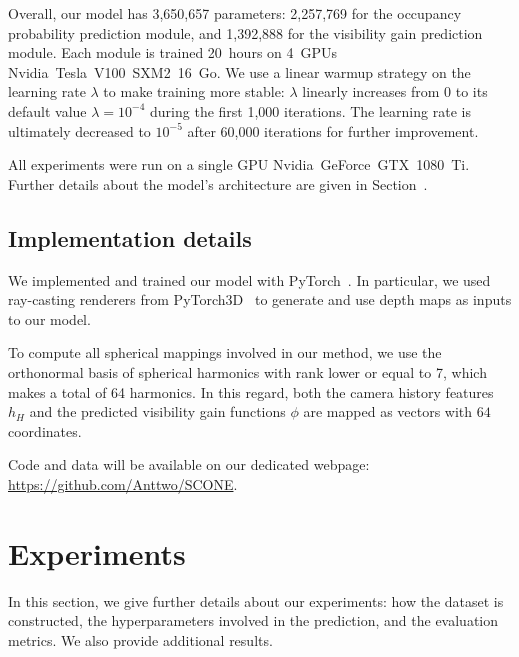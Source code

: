 {Overall, our model has 3,650,657 parameters: 2,257,769 for the occupancy probability prediction module, and 1,392,888 for the visibility gain prediction module. Each module is trained 20~hours on 4~GPUs Nvidia~Tesla~V100~SXM2~16~Go. %
%
We use a linear warmup strategy on the learning rate $\lambda$ to make training more stable: $\lambda$ linearly increases from 0 to its default value $\lambda=10^{-4}$ during the first 1,000 iterations. The learning rate is ultimately decreased to $10^{-5}$ after 60,000 iterations for further improvement.

All experiments were run on a single GPU Nvidia~GeForce~GTX~1080~Ti. Further details about the model's architecture are given in Section~.}


\subsection{Implementation details}
\label{sec:implementation}

We implemented and trained our model with PyTorch~\cite{paszke_pytorch}. In particular, we used ray-casting renderers from PyTorch3D~\cite{ravi_pytorch3d} to generate and use depth maps as inputs to our model.

To compute all spherical mappings involved in our method, we use the orthonormal basis of spherical harmonics with rank lower or equal to 7, which makes a total of 64 harmonics. In this regard, both the camera history features $h_H$ and the predicted visibility gain functions $\phi$ are mapped as vectors with $64$ coordinates.

Code and data will be available on our dedicated webpage: \url{https://github.com/Anttwo/SCONE}.

\section{Experiments}
\label{sec:supp_mat_3_experiments}

In this section, we give further details about our experiments: how the dataset is constructed, the hyperparameters involved in the prediction, and the evaluation metrics. We also provide additional results.

